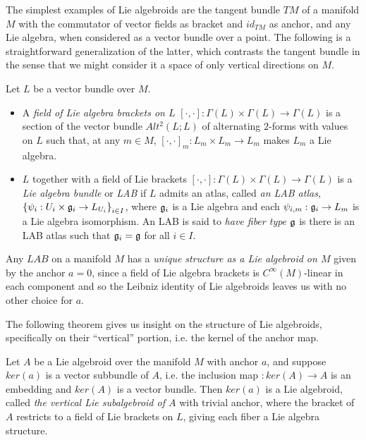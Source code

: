 \linea 

The simplest examples of Lie algebroids are the tangent bundle $TM$ of a manifold $M$ with the commutator of vector fields as bracket and $id_{TM}$ as anchor, and any Lie algebra, when considered as a vector bundle over a point. The following is a straightforward generalization of the latter, which contrasts the tangent bundle in the sense that we might consider it a space of only vertical directions on $M$.

\begin{definition}[LAB]\label{defnLAB}
    Let $L$ be a vector bundle over $M$.
    
    \begin{itemize}
    
    \item A \emph{field of Lie algebra brackets on $L$} $[\cdot, \cdot]:\Gamma(L) \times \Gamma(L) \to \Gamma(L)$ is a section of the vector bundle $Alt^2(L; L)$ of alternating $2$-forms with values on $L$ such that, at any $m \in M$, $[\cdot, \cdot]_m:L_m \times L_m \to L_m$ makes $L_m$ a Lie algebra.
    
    \item $L$ together with a field of Lie brackets $[\cdot, \cdot]:\Gamma(L) \times \Gamma(L) \to \Gamma(L)$ is a \emph{Lie algebra bundle} or \emph{LAB} if $L$ admits an atlas, called \emph{an LAB atlas}, $\left\{ \psi_i: U_i \times \mathfrak{g}_i \to L_{U_i} \right\}_{i \in I}$, where $\mathfrak{g}_i$ is a Lie algebra and each $\psi_{i, m}: \mathfrak{g}_i \to L_m$ is a Lie algebra isomorphism. An LAB is said to \emph{have fiber type $\mathfrak{g}$} is there is an LAB atlas such that $\mathfrak{g}_i = \mathfrak{g}$ for all $i \in I$.
    
    \end{itemize}
    
\end{definition}

Any $LAB$ on a manifold $M$ has a \emph{unique structure as a Lie algebroid on $M$} given by the anchor $a = 0$, since a field of Lie algebra brackets is $C^\infty(M)$-linear in each component and so the Leibniz identity of Lie algebroids leaves us with no other choice for $a$.

The following theorem gives us insight on the structure of Lie algebroids, specifically on their ``vertical'' portion, i.e. the kernel of the anchor map.

\begin{theorem} \label{theoFiberLie}
Let $A$ be a Lie algebroid over the manifold $M$ with anchor $a$, and suppose $ker(a)$ is a vector subbundle of $A$, i.e. the inclusion map $:ker(A) \to A$ is an embedding and $ker(A)$ is a vector bundle. Then $ker(a)$ %
is a Lie algebroid, called \emph{the vertical Lie subalgebroid of $A$} with trivial anchor, where the bracket of $A$ restricts to a field of Lie brackets on $L$, giving each fiber a Lie algebra structure.
\end{theorem}

